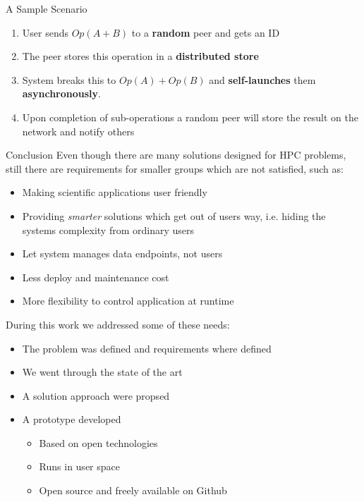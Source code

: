 \documentclass[final,hyperref={pdfpagelabels=true}]{beamer}
\begin{document}
\begin{frame}
\begin{columns}[t]
\begin{column}{.45\textwidth}
      \begin{block}{A Sample Scenario}
      \begin{enumerate}
      \item User sends \(Op(A + B) \) to a \textbf{random} peer and gets an ID
      \item The peer stores this operation in a \textbf{distributed store}
      \item System breaks this to \(Op(A) + Op(B) \) and \textbf{self-launches} them \textbf{asynchronously}.
      \item Upon completion of sub-operations a random peer will store the result on the network and notify others
      \end{enumerate}
      \end{block}
	  \begin{block}{Conclusion}
	  Even though there are many solutions designed for HPC problems, still there are requirements for smaller groups which are not satisfied, such as:
	  \begin{itemize}
	  \item Making scientific applications user friendly 
	  \item Providing \textit{smarter} solutions which get out of users way, i.e. hiding the systems complexity from ordinary users
	  \item Let system manages data endpoints, not users
	  \item Less deploy and maintenance cost
	  \item More flexibility to control application at runtime
	  \end{itemize}
	  During this work we addressed some of these needs:
	  \begin{itemize}
	  \item The problem was defined and requirements where defined
	  \item We went through the state of the art
	  \item A solution approach were propsed
	  \item A prototype developed
	  \begin{itemize}
	  \fontsize{27pt}{28}\selectfont
	  \item Based on open technologies
	  \item Runs in user space
	  \item Open source and freely available on Github\cite{konsensus}
	  \end{itemize}
	  \end{itemize}

\end{block}
\end{column}
\end{columns}
\end{frame}
\end{document}
